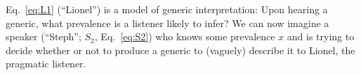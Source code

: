 \documentclass[10pt,letterpaper]{article}
\newcommand{\denote}[1]{\mbox{ $[\![ #1 ]\!]$}}
\begin{document}

 
Eq.~\ref{eq:L1} (``Lionel'') is a model of generic interpretation: Upon hearing a generic, what prevalence is a listener likely to infer?
We can now imagine a speaker (``Steph''; $S_2$, Eq.~\ref{eq:S2}) who knows some prevalence $x$ and is trying to decide whether or not to produce a generic to (vaguely) describe it to Lionel, the pragmatic listener.
\end{document}
